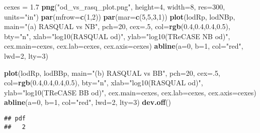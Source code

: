 \documentclass[]{article}
\newenvironment{Shaded}{\begin{snugshade}}{\end{snugshade}}
\newcommand{\KeywordTok}[1]{\textcolor[rgb]{0.13,0.29,0.53}{\textbf{#1}}}
\newcommand{\DataTypeTok}[1]{\textcolor[rgb]{0.13,0.29,0.53}{#1}}
\newcommand{\DecValTok}[1]{\textcolor[rgb]{0.00,0.00,0.81}{#1}}
\newcommand{\FloatTok}[1]{\textcolor[rgb]{0.00,0.00,0.81}{#1}}
\newcommand{\StringTok}[1]{\textcolor[rgb]{0.31,0.60,0.02}{#1}}
\newcommand{\NormalTok}[1]{#1}
\begin{document}
\begin{Shaded}
\begin{Highlighting}[]
\NormalTok{cexes =}\StringTok{ }\FloatTok{1.7}
\KeywordTok{png}\NormalTok{(}\StringTok{"od_vs_rasq_plot.png"}\NormalTok{, }\DataTypeTok{height=}\DecValTok{4}\NormalTok{, }\DataTypeTok{width=}\DecValTok{8}\NormalTok{, }\DataTypeTok{res=}\DecValTok{300}\NormalTok{, }\DataTypeTok{units=}\StringTok{"in"}\NormalTok{)}
\KeywordTok{par}\NormalTok{(}\DataTypeTok{mfrow=}\KeywordTok{c}\NormalTok{(}\DecValTok{1}\NormalTok{,}\DecValTok{2}\NormalTok{))}
\KeywordTok{par}\NormalTok{(}\DataTypeTok{mar=}\KeywordTok{c}\NormalTok{(}\DecValTok{5}\NormalTok{,}\DecValTok{5}\NormalTok{,}\DecValTok{3}\NormalTok{,}\DecValTok{1}\NormalTok{))}
\KeywordTok{plot}\NormalTok{(lodRp, lodNBp, }\DataTypeTok{main=}\StringTok{"(a) RASQUAL vs NB"}\NormalTok{, }\DataTypeTok{pch=}\DecValTok{20}\NormalTok{, }\DataTypeTok{cex=}\NormalTok{.}\DecValTok{5}\NormalTok{, }\DataTypeTok{col=}\KeywordTok{rgb}\NormalTok{(}\FloatTok{0.4}\NormalTok{,}\FloatTok{0.4}\NormalTok{,}\FloatTok{0.4}\NormalTok{,}\FloatTok{0.5}\NormalTok{), }\DataTypeTok{bty=}\StringTok{"n"}\NormalTok{,}
     \DataTypeTok{xlab=}\StringTok{"log10(RASQUAL od)"}\NormalTok{, }\DataTypeTok{ylab=}\StringTok{"log10(TReCASE NB od)"}\NormalTok{, }\DataTypeTok{cex.main=}\NormalTok{cexes, }\DataTypeTok{cex.lab=}\NormalTok{cexes, }\DataTypeTok{cex.axis=}\NormalTok{cexes)}
\KeywordTok{abline}\NormalTok{(}\DataTypeTok{a=}\DecValTok{0}\NormalTok{, }\DataTypeTok{b=}\DecValTok{1}\NormalTok{, }\DataTypeTok{col=}\StringTok{"red"}\NormalTok{, }\DataTypeTok{lwd=}\DecValTok{2}\NormalTok{, }\DataTypeTok{lty=}\DecValTok{3}\NormalTok{)}

\KeywordTok{plot}\NormalTok{(lodRp, lodBBp, }\DataTypeTok{main=}\StringTok{"(b) RASQUAL vs BB"}\NormalTok{, }\DataTypeTok{pch=}\DecValTok{20}\NormalTok{, }\DataTypeTok{cex=}\NormalTok{.}\DecValTok{5}\NormalTok{, }\DataTypeTok{col=}\KeywordTok{rgb}\NormalTok{(}\FloatTok{0.4}\NormalTok{,}\FloatTok{0.4}\NormalTok{,}\FloatTok{0.4}\NormalTok{,}\FloatTok{0.5}\NormalTok{), }\DataTypeTok{bty=}\StringTok{"n"}\NormalTok{,}
     \DataTypeTok{xlab=}\StringTok{"log10(RASQUAL od)"}\NormalTok{, }\DataTypeTok{ylab=}\StringTok{"log10(TReCASE BB od)"}\NormalTok{, }\DataTypeTok{cex.main=}\NormalTok{cexes, }\DataTypeTok{cex.lab=}\NormalTok{cexes, }\DataTypeTok{cex.axis=}\NormalTok{cexes)}
\KeywordTok{abline}\NormalTok{(}\DataTypeTok{a=}\DecValTok{0}\NormalTok{, }\DataTypeTok{b=}\DecValTok{1}\NormalTok{, }\DataTypeTok{col=}\StringTok{"red"}\NormalTok{, }\DataTypeTok{lwd=}\DecValTok{2}\NormalTok{, }\DataTypeTok{lty=}\DecValTok{3}\NormalTok{)}
\KeywordTok{dev.off}\NormalTok{()}
\end{Highlighting}
\end{Shaded}

\begin{verbatim}
## pdf 
##   2
\end{verbatim}
\end{document}
